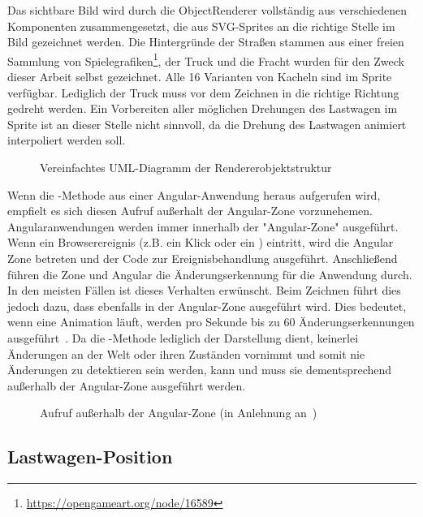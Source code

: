Das sichtbare Bild wird durch die ObjectRenderer vollständig aus verschiedenen Komponenten zusammengesetzt, die aus SVG-Sprites an die richtige Stelle im Bild gezeichnet werden. Die Hintergründe der Straßen stammen aus einer freien Sammlung von Spielegrafiken\footnote{\url{https://opengameart.org/node/16589}}, der Truck und die Fracht wurden für den Zweck dieser Arbeit selbst gezeichnet. Alle 16 Varianten von Kacheln sind im Sprite verfügbar. Lediglich der Truck muss vor dem Zeichnen in die richtige Richtung gedreht werden. Ein Vorbereiten aller möglichen Drehungen des Lastwagen im Sprite ist an dieser Stelle nicht sinnvoll, da die Drehung des Lastwagen animiert interpoliert werden soll.

\begin{figure}
  
  \caption{Vereinfachtes UML-Diagramm der Rendererobjektstruktur}
  \label{sec:implementation:rendering:structure:uml}
\end{figure}

Wenn die -Methode aus einer Angular-Anwendung heraus aufgerufen wird, empfielt es sich diesen Aufruf außerhalt der Angular-Zone vorzunehemen. Angularanwendungen werden immer innerhalb der "Angular-Zone" ausgeführt. Wenn ein Browserereignis (z.B. ein Klick oder ein ) eintritt, wird die Angular Zone betreten und der Code zur Ereignisbehandlung ausgeführt. Anschließend führen die Zone und Angular die Änderungserkennung für die Anwendung durch. In den meisten Fällen ist dieses Verhalten erwünscht. Beim Zeichnen führt dies jedoch dazu, dass  ebenfalls in der Angular-Zone ausgeführt wird. Dies bedeutet, wenn eine Animation läuft, werden pro Sekunde bis zu 60 Änderungserkennungen ausgeführt~\cite{angular-canvas}. Da die -Methode lediglich der Darstellung dient, keinerlei Änderungen an der Welt oder ihren Zuständen vornimmt und somit nie Änderungen zu detektieren sein werden, kann und muss sie dementsprechend außerhalb der Angular-Zone ausgeführt werden.

\begin{figure}
  
  \caption{Aufruf außerhalb der Angular-Zone (in Anlehnung an~\cite{angular-canvas})}
  \label{sec:implementation:rendering:structure:ngzone}
\end{figure}

\subsection{Lastwagen-Position}
\label{sec:implementation:rendering:truck-position}

